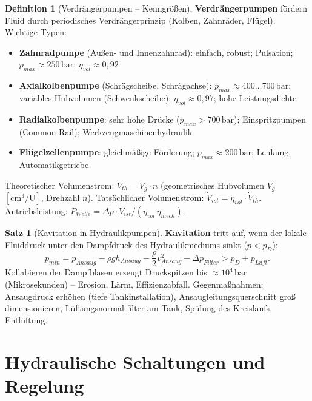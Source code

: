 ﻿\documentclass[a4paper,12pt]{report}
\theoremstyle{definition}
\newtheorem{definition}{Definition}
\newtheorem{satz}{Satz}
\begin{document}
\begin{definition}[Verdrängerpumpen -- Kenngrößen]
\textbf{Verdrängerpumpen} fördern Fluid durch periodisches Verdrängerprinzip
(Kolben, Zahnräder, Flügel). Wichtige Typen:
\begin{itemize}
    \item[-] \textbf{Zahnradpumpe} (Außen- und Innenzahnrad): einfach, robust;
          Pulsation; $p_{max} \approx 250\,\mathrm{bar}$; $\eta_{vol} \approx 0{,}92$
    \item[-] \textbf{Axialkolbenpumpe} (Schrägscheibe, Schrägachse):
          $p_{max} \approx 400\ldots700\,\mathrm{bar}$; variables Hubvolumen (Schwenkscheibe);
          $\eta_{vol} \approx 0{,}97$; hohe Leistungsdichte
    \item[-] \textbf{Radialkolbenpumpe}: sehr hohe Drücke ($p_{max} > 700\,\mathrm{bar}$);
          Einspritzpumpen (Common Rail); Werkzeugmaschinenhydraulik
    \item[-] \textbf{Flügelzellenpumpe}: gleichmäßige Förderung; $p_{max} \approx 200\,\mathrm{bar}$;
          Lenkung, Automatikgetriebe
\end{itemize}
Theoretischer Volumenstrom: $\dot{V}_{th} = V_g \cdot n$ (geometrisches Hubvolumen $V_g$
$[\mathrm{cm^3/U}]$, Drehzahl $n$).
Tatsächlicher Volumenstrom: $\dot{V}_{ist} = \eta_{vol} \cdot \dot{V}_{th}$.
Antriebsleistung: $P_{Welle} = \Delta p \cdot \dot{V}_{ist} / (\eta_{vol}\,\eta_{mech})$.
\end{definition}

\begin{satz}[Kavitation in Hydraulikpumpen]
\textbf{Kavitation} tritt auf, wenn der lokale Fluiddruck unter den
Dampfdruck des Hydraulikmediums sinkt ($p < p_D$):
\[
  p_{min} = p_{Ansaug} - \rho g h_{Ansaug} - \frac{\rho}{2}v_{Ansaug}^2 - \Delta p_{Filter} > p_D + p_{Luft}.
\]
Kollabieren der Dampfblasen erzeugt Druckspitzen bis $\approx 10^4\,\mathrm{bar}$
(Mikrosekunden) -- Erosion, Lärm, Effizienzabfall.
Gegenmaßnahmen: Ansaugdruck erhöhen (tiefe Tankinstallation),
Ansaugleitungsquerschnitt groß dimensionieren, Lüftungsnormal-filter am Tank,
Spülung des Kreislaufs, Entlüftung.
\end{satz}

\section{Hydraulische Schaltungen und Regelung}
\end{document}
